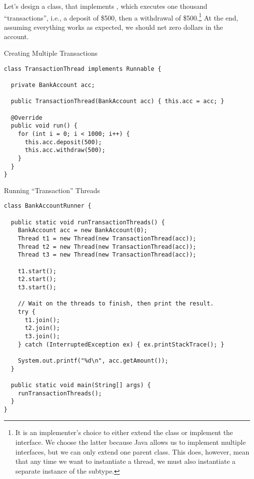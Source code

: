 Let's design a  class, that implements , which executes one thousand ``transactions'', i.e., a deposit of \$500, then a withdrawal of \$500.\footnote{It is an implementer's choice to either extend the  class or implement the  interface. We choose the latter because Java allows us to implement multiple interfaces, but we can only extend one parent class. This does, however, mean that any time we want to instantiate a thread, we must also instantiate a separate instance of the  subtype.} At the end, assuming everything works as expected, we should net zero dollars in the account.

\begin{cl}{Creating Multiple Transactions}
\begin{lstlisting}[language=MyJava]
class TransactionThread implements Runnable {

  private BankAccount acc;

  public TransactionThread(BankAccount acc) { this.acc = acc; }

  @Override
  public void run() {
    for (int i = 0; i < 1000; i++) {
      this.acc.deposit(500);
      this.acc.withdraw(500);
    }
  }
}
\end{lstlisting}
\end{cl}

\begin{cl}{Running ``Transaction'' Threads}
\begin{lstlisting}[language=MyJava]
class BankAccountRunner {

  public static void runTransactionThreads() {
    BankAccount acc = new BankAccount(0);
    Thread t1 = new Thread(new TransactionThread(acc));
    Thread t2 = new Thread(new TransactionThread(acc));
    Thread t3 = new Thread(new TransactionThread(acc));

    t1.start();
    t2.start();
    t3.start();

    // Wait on the threads to finish, then print the result.
    try {
      t1.join();
      t2.join();
      t3.join();
    } catch (InterruptedException ex) { ex.printStackTrace(); }

    System.out.printf("%d\n", acc.getAmount());
  }

  public static void main(String[] args) {
    runTransactionThreads();
  }
}
\end{lstlisting}
\end{cl}

